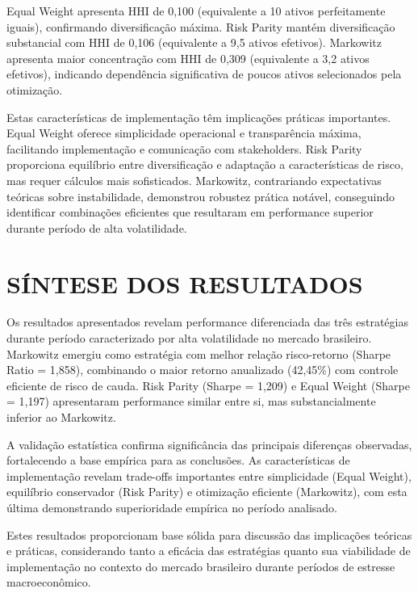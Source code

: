 Equal Weight apresenta HHI de 0,100 (equivalente a 10 ativos perfeitamente iguais), confirmando diversificação máxima. Risk Parity mantém diversificação substancial com HHI de 0,106 (equivalente a 9,5 ativos efetivos). Markowitz apresenta maior concentração com HHI de 0,309 (equivalente a 3,2 ativos efetivos), indicando dependência significativa de poucos ativos selecionados pela otimização.

Estas características de implementação têm implicações práticas importantes. Equal Weight oferece simplicidade operacional e transparência máxima, facilitando implementação e comunicação com stakeholders. Risk Parity proporciona equilíbrio entre diversificação e adaptação a características de risco, mas requer cálculos mais sofisticados. Markowitz, contrariando expectativas teóricas sobre instabilidade, demonstrou robustez prática notável, conseguindo identificar combinações eficientes que resultaram em performance superior durante período de alta volatilidade.

\section{SÍNTESE DOS RESULTADOS}

Os resultados apresentados revelam performance diferenciada das três estratégias durante período caracterizado por alta volatilidade no mercado brasileiro. Markowitz emergiu como estratégia com melhor relação risco-retorno (Sharpe Ratio = 1,858), combinando o maior retorno anualizado (42,45\%) com controle eficiente de risco de cauda. Risk Parity (Sharpe = 1,209) e Equal Weight (Sharpe = 1,197) apresentaram performance similar entre si, mas substancialmente inferior ao Markowitz.

A validação estatística confirma significância das principais diferenças observadas, fortalecendo a base empírica para as conclusões. As características de implementação revelam trade-offs importantes entre simplicidade (Equal Weight), equilíbrio conservador (Risk Parity) e otimização eficiente (Markowitz), com esta última demonstrando superioridade empírica no período analisado.

Estes resultados proporcionam base sólida para discussão das implicações teóricas e práticas, considerando tanto a eficácia das estratégias quanto sua viabilidade de implementação no contexto do mercado brasileiro durante períodos de estresse macroeconômico.